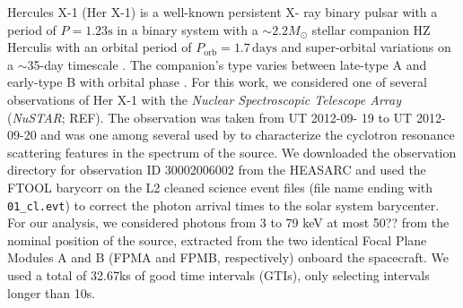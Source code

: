 \documentclass[twocolumn]{aastex62}
\newcommand{\project}[1]{\textsl{#1}\xspace}
\newcommand{\nustar}{\project{NuSTAR}\xspace}
\begin{document}
Hercules X-1 (Her X-1) is a well-known persistent X- ray binary pulsar with a period of $P = 1.23 \mathrm{s}$ \citep{tananbaum1972} in a binary system with a $\sim 2.2 M_\odot$ stellar companion HZ Herculis \citep{davidsen1972,forman1972,bahcall1972,reynolds1997,leahy2014} with an orbital period of $P_\mathrm{orb}=1.7\,\mathrm{days}$ and super-orbital variations on a $\sim$35-day timescale \citep{giacconi1973,scott1999,igna2011}. The companion's type varies between late-type A and early-type B with orbital phase \citep{anderson1994,cheng1995}. 
For this work, we considered one of several observations of Her X-1 with the \textit{Nuclear Spectroscopic Telescope Array} (\nustar; REF). The observation was taken from UT 2012-09- 19 to UT 2012-09-20 and was one among several used by \citep{Fuerst13} to characterize the cyclotron resonance scattering features in the spectrum of the source. We downloaded the observation directory for observation ID 30002006002 from the HEASARC and used the FTOOL barycorr on the L2 cleaned science event files (file name ending with \verb|01_cl.evt|) to correct the photon arrival times to the solar system barycenter. For our analysis, we considered photons from 3 to 79 keV at most 50?? from the nominal position of the source, extracted from the two identical Focal Plane Modules A and B (FPMA and FPMB, respectively) onboard the spacecraft. We used a total of 32.67ks of good time intervals (GTIs), only selecting intervals longer than 10s. 



\end{document}
